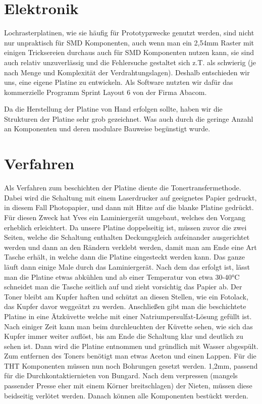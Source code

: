 \documentclass{article}
\begin{document}
\newpage    
\section{Elektronik}%

Lochrasterplatinen, wie sie häufig für Prototypzwecke genutzt werden, sind nicht nur unpraktisch für SMD Komponenten, auch wenn man ein 2,54mm Raster mit einigen Tricksereien durchaus auch für SMD Komponenten nutzen kann, sie sind auch relativ unzuverlässig und die Fehlersuche gestaltet sich z.T. als schwierig (je nach Menge und Komplexität der Verdrahtungslagen).
Deshalb entschieden wir uns, eine eigene Platine zu entwickeln.
Als Software nutzten wir dafür das kommerzielle Programm Sprint Layout 6 von der Firma Abacom.

Da die Herstellung der Platine von Hand erfolgen sollte, haben wir die Strukturen der Platine sehr grob gezeichnet. Was auch durch die geringe Anzahl an Komponenten und deren modulare Bauweise begünstigt wurde.

\section{Verfahren}%

Als Verfahren zum beschichten der Platine diente die Tonertransfermethode. Dabei wird die Schaltung mit einem Laserdrucker auf geeignetes Papier gedruckt, in diesem Fall Photopapier, und dann mit Hitze auf die blanke Platine gedrückt. Für diesen Zweck hat Yves ein Laminiergerät umgebaut, welches den Vorgang erheblich erleichtert.
Da unsere Platine doppelseitig ist, müssen zuvor die zwei Seiten, welche die Schaltung enthalten Deckungsgleich aufeinander ausgerichtet werden und dann an den Rändern verklebt werden, damit man am Ende eine Art Tasche erhält, in welche dann die Platine eingesteckt werden kann.
Das ganze läuft dann einige Male durch das Laminiergerät. Nach dem das erfolgt ist, lässt man die Platine etwas abkühlen und ab einer Temperatur von etwa 30-40°C schneidet man die Tasche seitlich auf und zieht vorsichtig das Papier ab. Der Toner bleibt am Kupfer haften und schützt an diesen Stellen, wie ein Fotolack, das Kupfer davor weggeätzt zu werden.
Anschließen gibt man die beschichtete Platine in eine Ätzküvette welche mit einer Natriumpersulfat-Lösung gefüllt ist. Nach einiger Zeit kann man beim durchleuchten der Küvette sehen, wie sich das Kupfer immer weiter auflöst, bis am Ende die Schaltung klar und deutlich zu sehen ist. Dann wird die Platine entnommen und gründlich mit Wasser abgespült.
Zum entfernen des Toners benötigt man etwas Aceton und einen Lappen.
Für die THT Komponenten müssen nun noch Bohrungen gesetzt werden. 1,2mm, passend für die Durchkontaktiernieten von Bungard.
Nach dem verpressen (mangels passender Presse eher mit einem Körner breitschlagen) der Nieten, müssen diese beidseitig verlötet werden. Danach können alle Komponenten bestückt werden.
\end{document}
